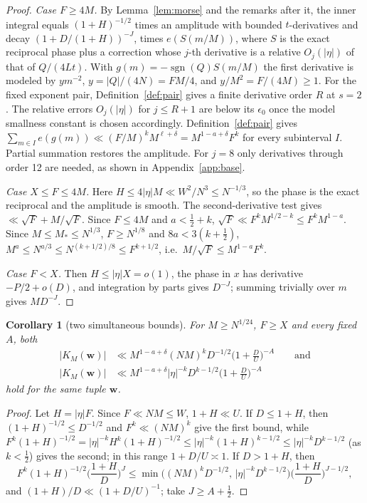 \documentclass[11pt]{amsart}
\newtheorem{corollary}[theorem]{Corollary}
\theoremstyle{definition}
\theoremstyle{remark}
\numberwithin{equation}{section}
\newcommand{\Mst}{M_{*}}
\DeclareMathOperator{\sgn}{sgn}
\begin{document}
\begin{proof}
\emph{Case $F\ge4M$.} By Lemma~\ref{lem:morse} and the remarks after it, the inner integral equals $(1+H)^{-1/2}$ times an amplitude with bounded $t$-derivatives and decay $(1+D/(1+H))^{-J}$, times $e(S(m/M))$, where $S$ is the exact reciprocal phase plus a correction whose $j$-th derivative is a relative $O_j(|\eta|)$ of that of $Q/(4Lt)$. With $g(m)=-\sgn(Q)S(m/M)$ the first derivative is modeled by $ym^{-2}$, $y=|Q|/(4N)=FM/4$, and $y/M^2=F/(4M)\ge1$. For the fixed exponent pair, Definition~\ref{def:pair} gives a finite derivative order $R$ at $s=2$. The relative errors $O_j(|\eta|)$ for $j\le R+1$ are below its $\epsilon_0$ once the model smallness constant is chosen accordingly. Definition~\ref{def:pair} gives $\sum_{m\in I}e(g(m))\ll(F/M)^kM^{\ell+\delta}=M^{1-a+\delta}F^k$ for every subinterval $I$. Partial summation restores the amplitude. For $j=8$ only derivatives through order 12 are needed, as shown in Appendix~\ref{app:base}.

\emph{Case $X\le F\le4M$.} Here $H\le4|\eta|M\ll W^2/N^3\le N^{-1/3}$, so the phase is the exact reciprocal and the amplitude is smooth. The second-derivative test gives $\ll\sqrt F+M/\sqrt F$. Since $F\le4M$ and $a<\frac12+k$, $\sqrt F\ll F^{k}M^{1/2-k}\le F^kM^{1-a}$. Since $M\le\Mst\le N^{1/3}$, $F\ge N^{1/8}$ and $8a<3(k+\frac12)$, $M^{a}\le N^{a/3}\le N^{(k+1/2)/8}\le F^{k+1/2}$, i.e.\ $M/\sqrt F\le M^{1-a}F^k$.

\emph{Case $F<X$.} Then $H\le|\eta|X=o(1)$, the phase in $x$ has derivative $-P/2+o(D)$, and integration by parts gives $D^{-J}$; summing trivially over $m$ gives $MD^{-J}$.
\end{proof}

\begin{corollary}[two simultaneous bounds]\label{cor:two}
For $M\ge N^{1/24}$, $F\ge X$ and every fixed $A$, both
\begin{align*}
|K_M(\mathbf w)|&\ll M^{1-a+\delta}(NM)^{k}D^{-1/2}\Big(1+\frac DU\Big)^{-A}
\qquad\text{and}\\
|K_M(\mathbf w)|&\ll M^{1-a+\delta}|\eta|^{-k}D^{k-1/2}\Big(1+\frac DU\Big)^{-A}
\end{align*}
hold for the same tuple $\mathbf w$.
\end{corollary}

\begin{proof}
Let $H=|\eta|F$. Since $F\ll NM\le W$, $1+H\ll U$. If $D\le1+H$, then $(1+H)^{-1/2}\le D^{-1/2}$ and $F^k\ll(NM)^k$ give the first bound, while $F^k(1+H)^{-1/2}=|\eta|^{-k}H^{k}(1+H)^{-1/2}\le|\eta|^{-k}(1+H)^{k-1/2}\le|\eta|^{-k}D^{k-1/2}$ (as $k<\frac12$) gives the second; in this range $1+D/U\asymp1$. If $D>1+H$, then
\[
F^k(1+H)^{-1/2}\Big(\frac{1+H}D\Big)^{J}\le\min\Big((NM)^kD^{-1/2},\,|\eta|^{-k}D^{k-1/2}\Big)\Big(\frac{1+H}D\Big)^{J-1/2},
\]
and $(1+H)/D\ll(1+D/U)^{-1}$; take $J\ge A+\frac12$.
\end{proof}
\end{document}
